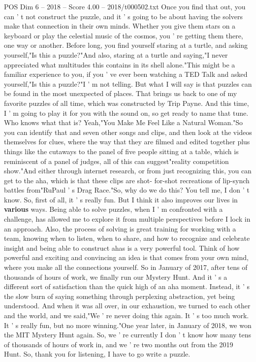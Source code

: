 \begin{textsample}{POS Dim 6 – 2018 – Score 4.00 – 2018/t000502.txt}
Once you find that out, you can ' t not construct the puzzle, and it ' s going to be about having the solvers make that connection in their own minds.
Whether you give them stars on a keyboard or play the celestial music of the cosmos, you ' re getting them there, one way or another.
Before long, you find yourself staring at a turtle, and asking yourself,"Is this a puzzle?"And also, staring at a turtle and saying,"I never appreciated what multitudes this contains in its shell alone."This might be a familiar experience to you, if you ' ve ever been watching a TED Talk and asked yourself,"Is this a puzzle?"I ' m not telling.
But what I will say is that puzzles can be found in the most unexpected of places.
That brings us back to one of my favorite puzzles of all time, which was constructed by Trip Payne.
And this time, I ' m going to play it for you with the sound on, so get ready to name that tune.
Who knows what that is?
Yeah,"You Make Me Feel Like a Natural Woman."So you can identify that and seven other songs and clips, and then look at the videos themselves for clues, where the way that they are filmed and edited together plus things like the cutaways to the panel of five people sitting at a table, which is reminiscent of a panel of judges, all of this can suggest"reality competition show."And either through internet research, or from just recognizing this, you can get to the aha, which is that these clips are shot- for-shot recreations of lip-synch battles from"RuPaul ' s Drag Race."So, why do we do this?
You tell me, I don ' t know.
So, first of all, it ' s really fun.
But I think it also improves our lives in \textbf{various} ways.
Being able to solve puzzles, when I ' m confronted with a challenge, has allowed me to explore it from multiple perspectives before I lock in an approach.
Also, the process of solving is great training for working with a team, knowing when to listen, when to share, and how to recognize and celebrate insight and being able to construct ahas is a very powerful tool.
Think of how powerful and exciting and convincing an idea is that comes from your own mind, where you make all the connections yourself.
So in January of 2017, after tens of thousands of hours of work, we finally run our Mystery Hunt.
And it ' s a different sort of satisfaction than the quick high of an aha moment.
Instead, it ' s the slow burn of saying something through perplexing abstraction, yet being understood.
And when it was all over, in our exhaustion, we turned to each other and the world, and we said,"We ' re never doing this again.
It ' s too much work.
It ' s really fun, but no more winning."One year later, in January of 2018, we won the MIT Mystery Hunt again.
So, we ' re currently I don ' t know how many tens of thousands of hours of work in, and we ' re two months out from the 2019 Hunt.
So, thank you for listening, I have to go write a puzzle.

\end{textsample}
